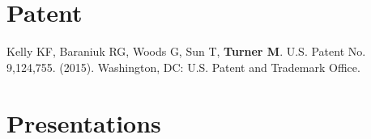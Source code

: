 \documentclass[letterpaper,11pt,oneside]{article}
\begin{document}
\noindent
\section*{\textcolor{gunmetal}{Patent}}

  \begin{hangparas}{0.25in}{1}
  Kelly KF, Baraniuk RG, Woods G, Sun T, \textbf{Turner M}. U.S. Patent No. 9,124,755. (2015).
Washington, DC: U.S. Patent and Trademark Office.    
    
  \end{hangparas}

\noindent
\section*{\textcolor{gunmetal}{Presentations}}
\end{document}
